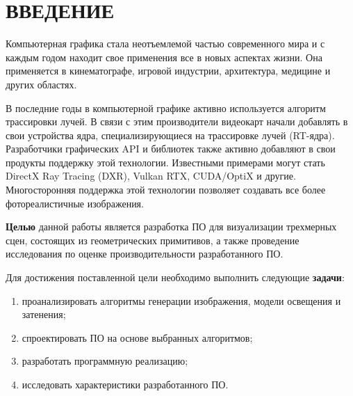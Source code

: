 \chapter*{ВВЕДЕНИЕ}

Компьютерная графика стала неотъемлемой частью современного мира и с каждым годом находит свое применения все в новых аспектах жизни. Она применяется в кинематографе, игровой индустрии, архитектура, медицине и других областях.

В последние годы в компьютерной графике активно используется алгоритм трассировки лучей. В связи с этим производители видеокарт начали добавлять в свои устройства ядра, специализирующиеся на трассировке лучей (RT-ядра). Разработчики графических API и библиотек также активно добавляют в свои продукты поддержку этой технологии. Известными примерами могут стать DirectX Ray Tracing (DXR), Vulkan RTX, CUDA/OptiX и другие. Многосторонняя поддержка этой технологии позволяет создавать все более фотореалистичные изображения.

\textbf{Целью} данной работы является разработка ПО для визуализации трехмерных сцен, состоящих из геометрических примитивов, а также проведение исследования по оценке производительности разработанного ПО.


Для достижения поставленной цели необходимо выполнить следующие \textbf{задачи}:
\begin{enumerate}
    \item проанализировать алгоритмы генерации изображения, модели освещения и затенения;
    \item спроектировать ПО на основе выбранных алгоритмов;
    \item разработать программную реализацию;
    \item исследовать характеристики разработанного ПО.
\end{enumerate}